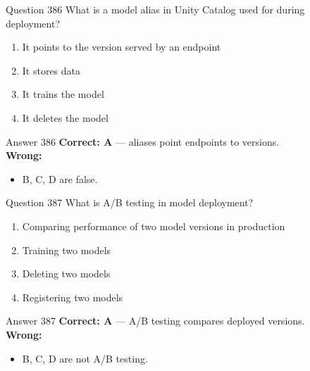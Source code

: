 \documentclass[aspectratio=169,11pt]{beamer}
\begin{document}
	\begin{frame}{Question 386}
		What is a model alias in Unity Catalog used for during deployment?
		\begin{enumerate}[label=\Alph*.]
			\item It points to the version served by an endpoint
			\item It stores data
			\item It trains the model
			\item It deletes the model
		\end{enumerate}
	\end{frame}
	\begin{frame}{Answer 386}
		\textbf{Correct: A} --- aliases point endpoints to versions.\\
		\vspace{0.5em}
		\textbf{Wrong:}
		\begin{itemize}
			\item B, C, D are false.
		\end{itemize}
	\end{frame}
	
	\begin{frame}{Question 387}
		What is A/B testing in model deployment?
		\begin{enumerate}[label=\Alph*.]
			\item Comparing performance of two model versions in production
			\item Training two models
			\item Deleting two models
			\item Registering two models
		\end{enumerate}
	\end{frame}
	\begin{frame}{Answer 387}
		\textbf{Correct: A} --- A/B testing compares deployed versions.\\
		\vspace{0.5em}
		\textbf{Wrong:}
		\begin{itemize}
			\item B, C, D are not A/B testing.
		\end{itemize}
	\end{frame}
	
\end{document}
